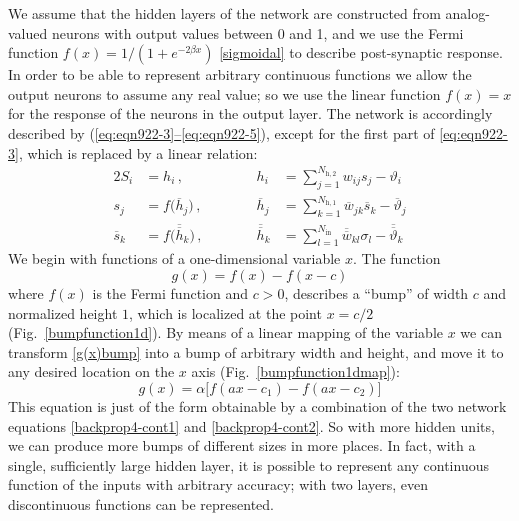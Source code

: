 We assume that the hidden layers of the network are constructed from analog-valued neurons with output values between 0 and 1, and we use the Fermi function $f(x)=1/(1+e^{-2\beta x})$ \eqref{sigmoidal} to describe post-synaptic response. In order to be able to represent arbitrary continuous functions we allow the output neurons to assume any real value; so we use the linear function $f(x)=x$ for the response of the neurons in the output layer. The network is accordingly described by (\hyperref[eq:eqn922-3]{\ref*{eq:eqn922-3}--\ref*{eq:eqn922-5}}), except for the first part of \eqref{eq:eqn922-3}, which is replaced by a linear relation:
\begin{alignat}{2}
S_i&=h_i\,, &\qquad\quad h_i&=\sum_{j=1}^{N_{\text{h},2}}w_{ij}s_j-\vartheta_i\label{backprop4-cont1}\\
s_j&=f\bigl(\overline{h}_j\bigr)\,, &\qquad\quad \overline{h}_j&=\sum_{k=1}^{N_{\text{h},1}}\overline{w}_{jk}\overline{s}_k-\overline{\vartheta}_j\label{backprop4-cont2}\\
\overline{s}_k&=f\bigl(\overline{\overline{h}}_k\bigr)\,, &\qquad\quad \overline{\overline{h}}_k&=\sum_{l=1}^{N_{\text{in}}}\overline{\overline{w}}_{kl}\sigma_l-\overline{\overline{\vartheta}}_k\label{backprop4-cont3}
\end{alignat}
We begin with functions of a one-dimensional variable $x$. The function
\begin{equation}\label{g(x)bump}
g(x)=f(x)-f(x-c)%
\end{equation}
where $f(x)$ is the Fermi function and $c>0$, describes a ``bump'' of width $c$ and normalized height $1$, which is localized at the point $x=c/2$ (Fig.~\ref{bumpfunction1d}). By means of a linear mapping of the variable $x$ we can transform \eqref{g(x)bump} into a bump of arbitrary width and height, and move it to any desired location on the $x$ axis (Fig.~\ref{bumpfunction1dmap}):
\begin{equation}\label{g(x)bump2}
g(x)=\alpha\bigl[f(ax-c_1)-f(ax-c_2)\bigr]
\end{equation}
This equation is just of the form obtainable by a combination of the two network equations \eqref{backprop4-cont1} and \eqref{backprop4-cont2}. So with more hidden units, we can produce more bumps of different sizes in more places. In fact, with a single, sufficiently large hidden layer, it is possible to represent any continuous function of the inputs with arbitrary accuracy; with two layers, even discontinuous functions can be represented.
